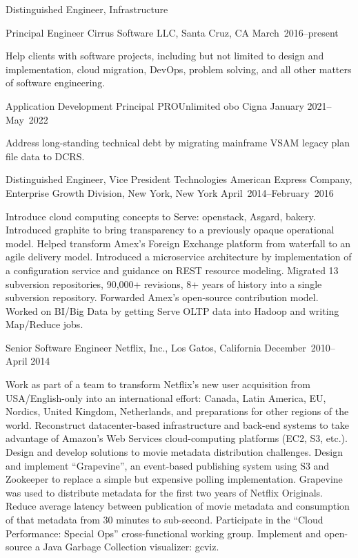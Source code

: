 \documentclass{resume}
\begin{document}
\begin{resume}
\begin{Employment}
\begin{job}{Distinguished Engineer, Infrastructure}
\end{job}

\begin{job}{Principal Engineer}
           {Cirrus Software LLC, Santa Cruz, CA}
           {March~2016--present}

Help clients with software projects, including but not limited to design and implementation, cloud migration, DevOps, problem solving, and all other matters of software engineering.

\end{job}

\begin{job}{Application Development Principal}
           {PROUnlimited obo Cigna}
           {January 2021--May~2022}

Address long-standing technical debt by migrating mainframe VSAM legacy plan file data to DCRS.

\end{job}
\begin{job}{Distinguished Engineer, Vice President Technologies}
           {American Express Company, Enterprise Growth Division, New York, New York}
           {April~2014--February~2016}

Introduce cloud computing concepts to Serve: openstack, Asgard,
bakery. Introduced graphite to bring transparency to a previously
opaque operational model. Helped transform Amex's Foreign Exchange
platform from waterfall to an agile delivery model. Introduced a
microservice architecture by implementation of a configuration service
and guidance on REST resource modeling. Migrated 13 subversion
repositories, 90,000+ revisions, 8+ years of history into a single
subversion repository. Forwarded Amex's open-source contribution
model. Worked on BI/Big Data by getting Serve OLTP data into Hadoop
and writing Map/Reduce jobs.

\end{job}
\begin{job}{Senior Software Engineer}
           {Netflix, Inc., Los Gatos, California}
           {December~2010--April 2014}

Work as part of a team to transform Netflix's new user acquisition
from USA/English-only into an international effort: Canada, Latin
America, EU, Nordics, United Kingdom, Netherlands, and preparations
for other regions of the world. Reconstruct datacenter-based
infrastructure and back-end systems to take advantage of Amazon's Web
Services cloud-computing platforms (EC2, S3, etc.).  Design and
develop solutions to movie metadata distribution challenges.  Design
and implement ``Grapevine'', an event-based publishing system using S3
and Zookeeper to replace a simple but expensive polling
implementation. Grapevine was used to distribute metadata for the
first two years of Netflix Originals. Reduce average latency between
publication of movie metadata and consumption of that metadata from 30
minutes to sub-second.  Participate in the ``Cloud Performance:
Special Ops'' cross-functional working group. Implement and
open-source a Java Garbage Collection visualizer: gcviz.


\end{job}
\end{Employment}
\end{resume}
\end{document}
